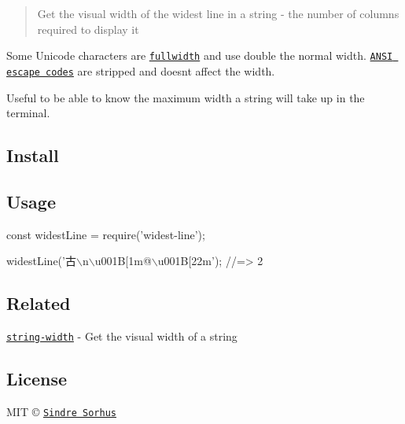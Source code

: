 \begin{quote}
Get the visual width of the widest line in a string -\/ the number of columns required to display it \end{quote}


Some Unicode characters are \href{https://en.wikipedia.org/wiki/Halfwidth_and_fullwidth_forms}{\tt fullwidth} and use double the normal width. \href{http://en.wikipedia.org/wiki/ANSI_escape_code}{\tt A\+N\+SI escape codes} are stripped and doesn\textquotesingle{}t affect the width.

Useful to be able to know the maximum width a string will take up in the terminal.

\subsection*{Install}




\subsection*{Usage}


\begin{DoxyCode}
const widestLine = require('widest-line');

widestLine('古\(\backslash\)n\(\backslash\)u001B[1m@\(\backslash\)u001B[22m');
//=> 2
\end{DoxyCode}


\subsection*{Related}


\begin{DoxyItemize}
\item \href{https://github.com/sindresorhus/string-width}{\tt string-\/width} -\/ Get the visual width of a string
\end{DoxyItemize}

\subsection*{License}

M\+IT © \href{https://sindresorhus.com}{\tt Sindre Sorhus} 